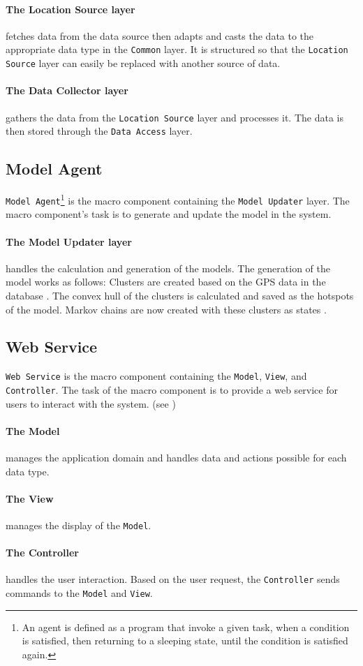 \paragraph{The Location Source layer} fetches data from the data source then adapts and casts the data to the appropriate data type in the \texttt{Common} layer.
It is structured so that the \texttt{Location Source} layer can easily be replaced with another source of data.

\paragraph{The Data Collector layer} gathers the data from the \texttt{Location Source} layer and processes it. 
The data is then stored through the \texttt{Data Access} layer.


\subsection{Model Agent}
\texttt{Model Agent}\footnote{An agent is defined as a program that invoke a given task, when a condition is satisfied, then returning to a sleeping state, until the condition is satisfied again.\cite{definitionagent}} is the macro component containing the \texttt{Model Updater} layer.
The macro component's task is to generate and update the model in the system. 

\paragraph{The Model Updater layer} handles the calculation and generation of the models.
The generation of the model works as follows:
Clusters are created based on the GPS data in the database .
The convex hull of the clusters is calculated and saved as the hotspots of the model.
Markov chains are now created with these clusters as states .

\subsection{Web Service}\label{arch:webservice}
\texttt{Web Service} is the macro component containing the \texttt{Model}, \texttt{View}, and \texttt{Controller}.
The task of the macro component is to provide a web service for users to interact with the system. (see )

\paragraph{The Model} manages the application domain and handles data and actions possible for each data type.

\paragraph{The View} manages the display of the \texttt{Model}.

\paragraph{The Controller} handles the user interaction. Based on the user request, the \texttt{Controller} sends commands to the \texttt{Model} and \texttt{View}.
